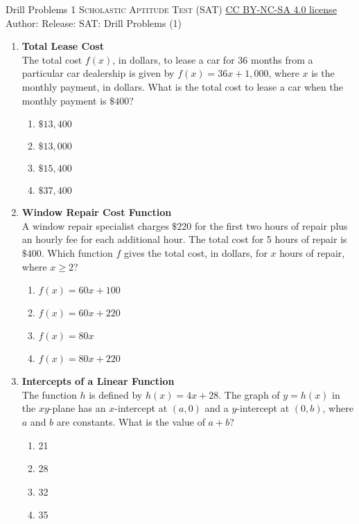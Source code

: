 \newpage\handout
{Drill Problems 1}
{\textsc{Scholastic Aptitude Test (SAT)}}
{\href{https://creativecommons.org/licenses/by-nc-sa/4.0/}{CC BY-NC-SA 4.0 license}}
{Author: \BookAuthor}{Release: \generatedOn}
{SAT: Drill Problems (1)}











\begin{enumerate}

\item \textbf{Total Lease Cost}\\
The total cost $f(x)$, in dollars, to lease a car for 36 months from a particular car dealership is given by $f(x) = 36x + 1,000$, where $x$ is the monthly payment, in dollars. What is the total cost to lease a car when the monthly payment is $\$400$?
\begin{enumerate}[label=(\Alph*)]
  \item $\$13,400$
  \item $\$13,000$
  \item $\$15,400$
  \item $\$37,400$
\end{enumerate}
\begin{subanswer}
\end{subanswer}


\item \textbf{Window Repair Cost Function}\\
A window repair specialist charges $\$220$ for the first two hours of repair plus an hourly fee for each additional hour. The total cost for 5 hours of repair is $\$400$. Which function $f$ gives the total cost, in dollars, for $x$ hours of repair, where $x \geq 2$?
\begin{enumerate}[label=(\Alph*)]
  \item $f(x) = 60x + 100$
  \item $f(x) = 60x + 220$
  \item $f(x) = 80x$
  \item $f(x) = 80x + 220$
\end{enumerate}
\begin{subanswer}
\end{subanswer}

\item \textbf{Intercepts of a Linear Function}\\
The function $h$ is defined by $h(x) = 4x + 28$. The graph of $y = h(x)$ in the $xy$-plane has an $x$-intercept at $(a, 0)$ and a $y$-intercept at $(0, b)$, where $a$ and $b$ are constants. What is the value of $a + b$?
\begin{enumerate}[label=(\Alph*)]
  \item 21
  \item 28
  \item 32
  \item 35
\end{enumerate}
\begin{subanswer}
\end{subanswer}


\end{enumerate}
